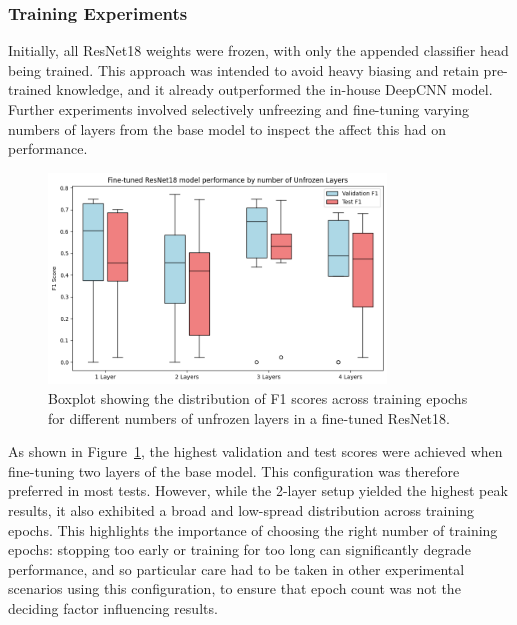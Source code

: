                 \subsubsection{Training Experiments}
    
                    Initially, all ResNet18 weights were frozen, with only the appended classifier head being trained. This approach was intended to avoid heavy biasing and retain pre-trained knowledge, and it already outperformed the in-house DeepCNN model. Further experiments involved selectively unfreezing and fine-tuning varying numbers of layers from the base model to inspect the affect this had on performance.
    
                    \begin{figure}[H]
                        \centering
                        \includegraphics[width=0.8\textwidth]{images/ResNetLayerTests.png}
                        \caption{Boxplot showing the distribution of F1 scores across training epochs for different numbers of unfrozen layers in a fine-tuned ResNet18.} \label{fig:ResNetLayers}
                    \end{figure}
                    
                    As shown in Figure~\ref{fig:ResNetLayers}, the highest validation and test scores were achieved when fine-tuning two layers of the base model. This configuration was therefore preferred in most tests. However, while the 2-layer setup yielded the highest peak results, it also exhibited a broad and low-spread distribution across training epochs. This highlights the importance of choosing the right number of training epochs: stopping too early or training for too long can significantly degrade performance, and so particular care had to be taken in other experimental scenarios using this configuration, to ensure that epoch count was not the deciding factor influencing results.
        
